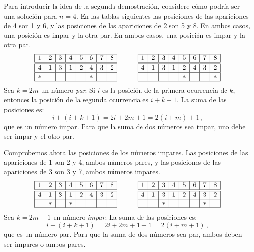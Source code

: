 Para introducir la idea de la segunda demostración, considere cómo podría ser una solución para $n=4$. En las tablas siguientes las posiciones de las apariciones de 4 son 1 y 6, y las posiciones de las apariciones de 2 son 5 y 8. En ambos casos, una posición es impar y la otra par. En ambos casos, una posición es impar y la otra par. 
\[
\begin{array}{|c|c|c|c|c|c|c|c|}
\hline
1&2&3&4&5&6&7&8\\
\hline\hline
4&1&3&1&2&4&3&2\\\hline
*&&&&&*&&\\\hline
\end{array}
\hspace{3em}
\begin{array}{|c|c|c|c|c|c|c|c|}
\hline
1&2&3&4&5&6&7&8\\
\hline\hline
4&1&3&1&2&4&3&2\\\hline
&&&&*&&&*\\\hline
\end{array}
\]
Sea $k=2m$ un número \emph{par}. Si $i$ es la posición de la primera ocurrencia de $k$, entonces la posición de la segunda ocurrencia es $i+k+1$.
La suma de las posiciones es:
\[
i+(i+k+1)=2i+2m+1=2(i+m)+1\,,
\]
que es un número impar. Para que la suma de dos números sea impar, uno debe ser impar y el otro par.

Comprobemos ahora las posiciones de los números impares. Las posiciones de las apariciones de 1 son 2 y 4, ambos números pares, y las posiciones de las apariciones de 3 son 3 y 7, ambos números impares.
\[
\begin{array}{|c|c|c|c|c|c|c|c|}
\hline
1&2&3&4&5&6&7&8\\
\hline\hline
4&1&3&1&2&4&3&2\\\hline
&*&&*&&&&\\\hline
\end{array}
\hspace{3em}
\begin{array}{|c|c|c|c|c|c|c|c|}
\hline
1&2&3&4&5&6&7&8\\
\hline\hline
4&1&3&1&2&4&3&2\\\hline
&&*&&&&*&\\\hline
\end{array}
\]
Sea $k=2m+1$ un número \emph{impar}. La suma de las posiciones es:
\[
i+(i+k+1)=2i+2m+1+1=2(i+m+1)\,,
\]
que es un número par. Para que la suma de dos números sea par, ambos deben ser impares o ambos pares.

